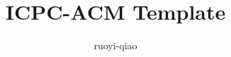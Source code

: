 \documentclass[11pt, a4paper, oneside]{ctexart}
\begin{document}
    \title{ICPC-ACM Template}
    \author{ruoyi-qiao}
    \maketitle
    \restoregeometry

    \tableofcontents
    \clearpage

    
    \clearpage

    
    \clearpage

    
    \clearpage

    
    \clearpage

    
    \clearpage

    
    \clearpage

    
    \clearpage

\end{document}
